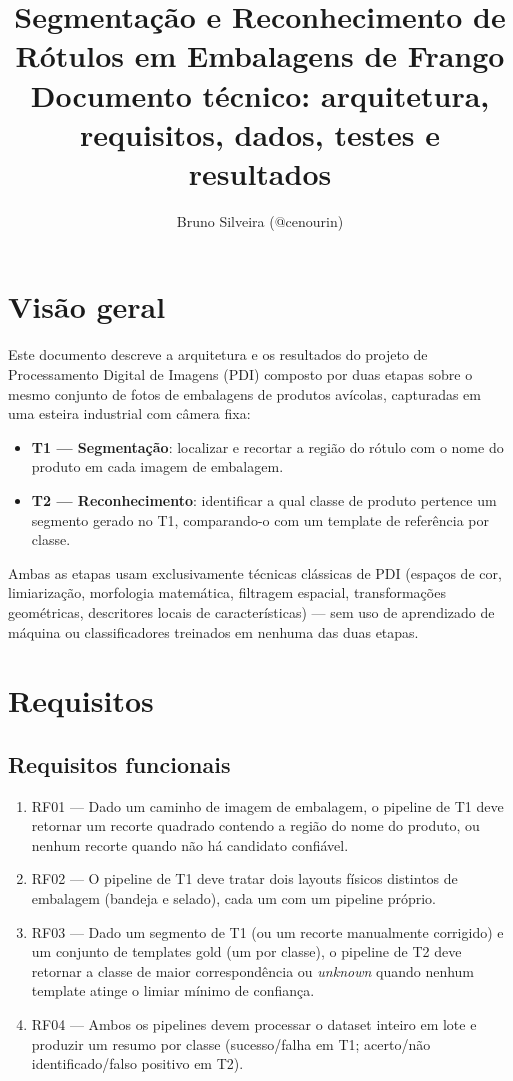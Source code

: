 \documentclass[a4paper,11pt]{article}
\title{Segmentação e Reconhecimento de Rótulos em Embalagens de Frango\\
\large Documento técnico: arquitetura, requisitos, dados, testes e resultados}
\author{Bruno Silveira (@cenourin)}
\date{}
\begin{document}
\maketitle
\tableofcontents

\section{Visão geral}

Este documento descreve a arquitetura e os resultados do projeto de Processamento Digital de
Imagens (PDI) composto por duas etapas sobre o mesmo conjunto de fotos de embalagens de produtos
avícolas, capturadas em uma esteira industrial com câmera fixa:

\begin{itemize}[nosep]
  \item \textbf{T1 --- Segmentação}: localizar e recortar a região do rótulo com o nome do
        produto em cada imagem de embalagem.
  \item \textbf{T2 --- Reconhecimento}: identificar a qual classe de produto pertence um
        segmento gerado no T1, comparando-o com um template de referência por classe.
\end{itemize}

Ambas as etapas usam exclusivamente técnicas clássicas de PDI (espaços de cor, limiarização,
morfologia matemática, filtragem espacial, transformações geométricas, descritores locais de
características) --- sem uso de aprendizado de máquina ou classificadores treinados em nenhuma
das duas etapas.

\section{Requisitos}

\subsection{Requisitos funcionais}

\begin{enumerate}[nosep]
  \item RF01 --- Dado um caminho de imagem de embalagem, o pipeline de T1 deve retornar um
        recorte quadrado contendo a região do nome do produto, ou nenhum recorte quando não há
        candidato confiável.
  \item RF02 --- O pipeline de T1 deve tratar dois layouts físicos distintos de embalagem
        (bandeja e selado), cada um com um pipeline próprio.
  \item RF03 --- Dado um segmento de T1 (ou um recorte manualmente corrigido) e um conjunto de
        templates gold (um por classe), o pipeline de T2 deve retornar a classe de maior
        correspondência ou \emph{unknown} quando nenhum template atinge o limiar mínimo de
        confiança.
  \item RF04 --- Ambos os pipelines devem processar o dataset inteiro em lote e produzir um
        resumo por classe (sucesso/falha em T1; acerto/não identificado/falso positivo em T2).
\end{enumerate}
\end{document}

